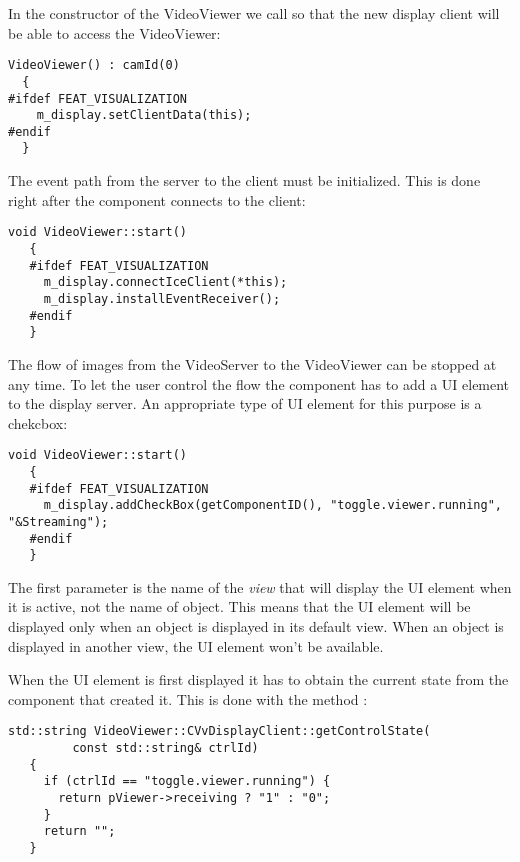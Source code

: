 In the constructor of the VideoViewer we call  so that
the new display client will be able to access the VideoViewer:

\begin{Verbatim}[fontsize=\scriptsize,gobble=3]
  VideoViewer() : camId(0)
  {
#ifdef FEAT_VISUALIZATION
    m_display.setClientData(this);
#endif
  }
\end{Verbatim}

The event path from the server to the client must be initialized. This is done
right after the component connects to the client:

\begin{Verbatim}[fontsize=\scriptsize,gobble=3]
   void VideoViewer::start()
   {
   #ifdef FEAT_VISUALIZATION
     m_display.connectIceClient(*this);
     m_display.installEventReceiver();
   #endif
   }
\end{Verbatim}

The flow of images from the VideoServer to the VideoViewer can be stopped at
any time. To let the user control the flow the component has to add a UI
element to the display server.  An appropriate type of UI element for this
purpose is a chekcbox:

\begin{Verbatim}[fontsize=\scriptsize,gobble=3]
   void VideoViewer::start()
   {
   #ifdef FEAT_VISUALIZATION
     m_display.addCheckBox(getComponentID(), "toggle.viewer.running", "&Streaming");
   #endif
   }
\end{Verbatim}

The first parameter is the name of the {\em view} that will display the UI
element when it is active, not the name of object. This means that the UI
element will be displayed only when an object is displayed in its default view.
When an object is displayed in another view, the UI element won't be available.

When the UI element is first displayed it has to obtain the current state from
the component that created it. This is done with the method
:

\begin{Verbatim}[fontsize=\scriptsize,gobble=3]
   std::string VideoViewer::CVvDisplayClient::getControlState(
         const std::string& ctrlId)
   {
     if (ctrlId == "toggle.viewer.running") {
       return pViewer->receiving ? "1" : "0";
     }
     return "";
   }
\end{Verbatim}


